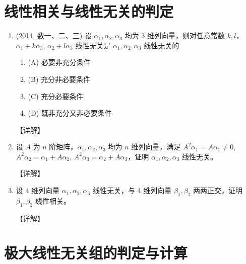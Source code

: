 \documentclass[12pt, a4paper, oneside, UTF8]{ctexbook}
\begin{document}
\section{线性相关与线性无关的判定}

\begin{enumerate}[label=\arabic*.,start=3]
    \item (2014, 数一、二、三) 设 $\alpha_1, \alpha_2, \alpha_3$ 均为 3 维列向量，则对任意常数 $k, l$，$\alpha_1 + k\alpha_3$, $\alpha_2 + l\alpha_3$ 线性无关是 $\alpha_1, \alpha_2, \alpha_3$ 线性无关的
    \begin{enumerate}
        \item (A) 必要非充分条件
        \item (B) 充分非必要条件
        \item (C) 充分必要条件
        \item (D) 既非充分又非必要条件
    \end{enumerate}
    
    \begin{solution}
    【详解】
    \end{solution}
    
    \item 设 $A$ 为 $n$ 阶矩阵，$\alpha_1, \alpha_2, \alpha_3$ 均为 $n$ 维列向量，满足 $A^2\alpha_1 = A\alpha_1 \neq 0$, $A^2\alpha_2 = \alpha_1 + A\alpha_2$,
    $A^2\alpha_3 = \alpha_2 + A\alpha_3$，证明 $\alpha_1, \alpha_2, \alpha_3$ 线性无关。
    
    \begin{solution}
    【详解】
    \end{solution}
    
    \item 设 4 维列向量 $\alpha_1, \alpha_2, \alpha_3$ 线性无关，与 4 维列向量 $\beta_1, \beta_2$ 两两正交，证明 $\beta_1, \beta_2$ 线性相关。
    
    \begin{solution}
    【详解】
    \end{solution}
\end{enumerate}

\section{极大线性无关组的判定与计算}
\end{document}

